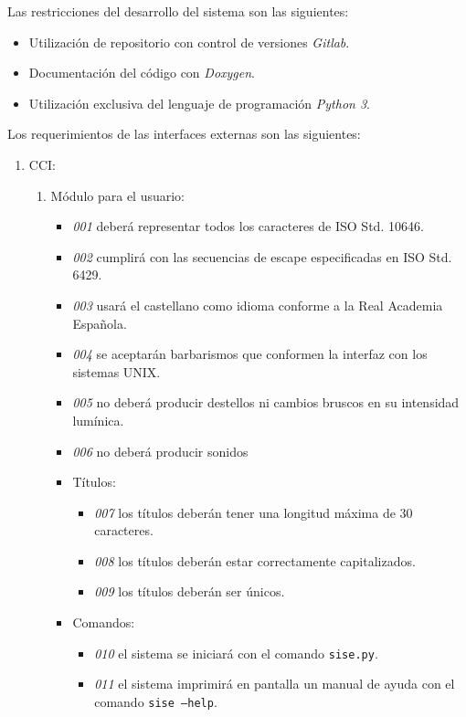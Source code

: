 Las restricciones del desarrollo del sistema son las siguientes:

\begin{itemize}
	\item Utilización de repositorio con control de versiones \emph{Gitlab}.
	\item Documentación del código con \emph{Doxygen}.
	\item Utilización exclusiva del lenguaje de programación \emph{Python 3}.
\end{itemize}

Los requerimientos de las interfaces externas son las siguientes:

\begin{enumerate}
	\item CCI:
		\begin{enumerate}
			\item Módulo para el usuario:
				\begin{itemize}
					\item \emph{001} deberá representar todos los caracteres de ISO Std. 10646.
					\item \emph{002} cumplirá con las secuencias de escape especificadas en ISO Std. 6429.
					\item \emph{003} usará el castellano como idioma conforme a la Real Academia Española.
					\item \emph{004} se aceptarán barbarismos que conformen la interfaz con los sistemas UNIX.
					\item \emph{005} no deberá producir destellos ni cambios bruscos en su intensidad lumínica.
					\item \emph{006} no deberá producir sonidos
					\item Títulos:
						\begin{itemize}
							\item \emph{007} los títulos deberán tener una longitud máxima de 30 caracteres.
							\item \emph{008} los títulos deberán estar correctamente capitalizados.
							\item \emph{009} los títulos deberán ser únicos.
						\end{itemize}
					\item Comandos:
						\begin{itemize}
							\item \emph{010} el sistema se iniciará con el comando \texttt{sise.py}.
							\item \emph{011} el sistema imprimirá en pantalla un manual de ayuda con el comando \texttt{sise --help}.

\end{itemize}
\end{itemize}
\end{enumerate}
\end{enumerate}
